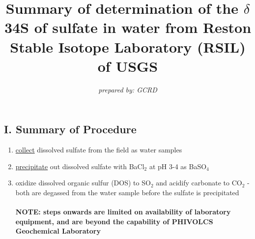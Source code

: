 \documentclass[a4paper,twoside,11pt]{article}
\begin{document}
\title{\vspace{-2\baselineskip} 
\textbf{Summary of determination of the $\delta$ 34S of sulfate in water from Reston Stable Isotope Laboratory (RSIL) of USGS}
}
\author{\textit{prepared by: GCRD}}

\maketitle

\subsection*{I. Summary of Procedure}
\begin{enumerate}
    \item \hyperlink{thesentence1}{collect} dissolved sulfate from the field as water samples
    \item \hyperlink{thesentence2}{precipitate} out dissolved sulfate with BaCl$_2$ at pH 3-4 as BaSO$_4$
    \item oxidize dissolved organic sulfur (DOS) to SO$_2$ and acidify carbonate to CO$_2$ - both are degassed from the water sample before the sulfate is precipitated \\ \\ \textbf{NOTE: steps onwards are limited on availability of laboratory equipment, and are beyond the capability of PHIVOLCS Geochemical Laboratory}
    

\end{enumerate}
\end{document}
